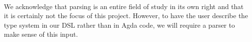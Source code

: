 {\begin{code}
\AgdaSymbol{(}\AgdaSymbol{;}\AgdaSpace{}%
\AgdaSymbol{;}\AgdaSpace{}%
\AgdaInductiveConstructor{[]}\AgdaSymbol{)}\<%
\\
\>[0]\AgdaSpace{}%
\AgdaSpace{}%
\AgdaSpace{}%
\AgdaSpace{}%
\AgdaSymbol{(}\AgdaSymbol{)}\<%
\\
\>[0]\AgdaSpace{}%
\AgdaSpace{}%
\<%
\\
\>[0]\AgdaSpace{}%
\AgdaSpace{}%
\AgdaSpace{}%
\AgdaSpace{}%
\AgdaSymbol{(}\AgdaSpace{}%
\AgdaSpace{}%
\AgdaSymbol{)}\<%
\\
\>[0]\AgdaSpace{}%
\AgdaSpace{}%
\AgdaSpace{}%
\AgdaSpace{}%
\AgdaSymbol{(}\AgdaSymbol{)}\<%
\\
\>[0]\AgdaSpace{}%
\AgdaSpace{}%
\<%
\\
\>[0]\AgdaSpace{}%
\AgdaSpace{}%
\AgdaSymbol{=}\AgdaSpace{}%
\AgdaSpace{}%
\AgdaSymbol{\{}\AgdaSpace{}%
\AgdaSymbol{=}\AgdaSpace{}%
\AgdaSymbol{\}}\AgdaSpace{}%
\<%
\end{code}
}

We acknowledge that parsing is an entire field of study in its own right
and that it is certainly not the focus of this project. However,
to have the user describe the type system in our DSL rather than in Agda
code, we will require a parser to make sense of this input.

